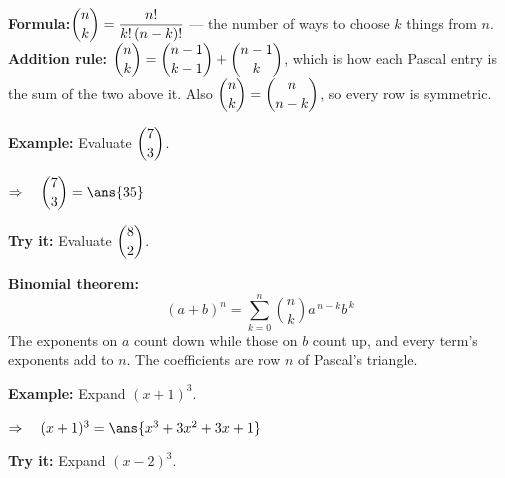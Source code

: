 \documentclass[12pt]{article}
\begin{document}


\begin{formulabox}
\textbf{Formula:}\quad $\dbinom{n}{k} = \dfrac{n!}{k!\,(n-k)!}$ --- the number of ways to
choose $k$ things from $n$. \quad \textbf{Addition rule:}
$\dbinom{n}{k} = \dbinom{n-1}{k-1} + \dbinom{n-1}{k}$, which is how each Pascal entry is the
sum of the two above it. Also $\dbinom{n}{k} = \dbinom{n}{n-k}$, so every row is symmetric.
\end{formulabox}

\begin{examplebox}
\textbf{Example:} \quad Evaluate $\dbinom{7}{3}$.

$\Rightarrow\quad \dbinom{7}{3} = \ans{35}$
\end{examplebox}

\begin{tryitbox}
\textbf{Try it:} \quad Evaluate $\dbinom{8}{2}$.\\[2pt]
\end{tryitbox}


\begin{formulabox}
\textbf{Binomial theorem:}
\[ (a + b)^n = \sum_{k=0}^{n} \binom{n}{k} a^{\,n-k} b^{\,k} \]
The exponents on $a$ count down while those on $b$ count up, and every term's exponents add
to $n$. The coefficients are row $n$ of Pascal's triangle.
\end{formulabox}

\begin{examplebox}
\textbf{Example:} \quad Expand $(x + 1)^3$.

$\Rightarrow\quad (x+1)^3 = \ans{x^3 + 3x^2 + 3x + 1}$
\end{examplebox}

\begin{tryitbox}
\textbf{Try it:} \quad Expand $(x - 2)^3$.\\[2pt]
\end{tryitbox}
\end{document}
